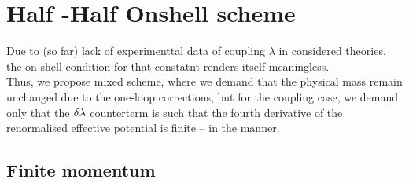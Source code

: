 \chapter{Half \MSbar-Half Onshell scheme}
Due to (so far) lack of experimenttal data of coupling $\lambda$ in considered theories, 
the on shell condition for that constatnt renders itself meaningless. \\
Thus, we propose mixed scheme, where we demand that the physical mass remain unchanged due to 
the one-loop corrections, but for the coupling case, we demand only that the $\delta\lambda$ 
counterterm is such that the fourth  derivative of the renormalised effective potential is finite 
-- in the \MSbar manner.
\section{Finite momentum}

